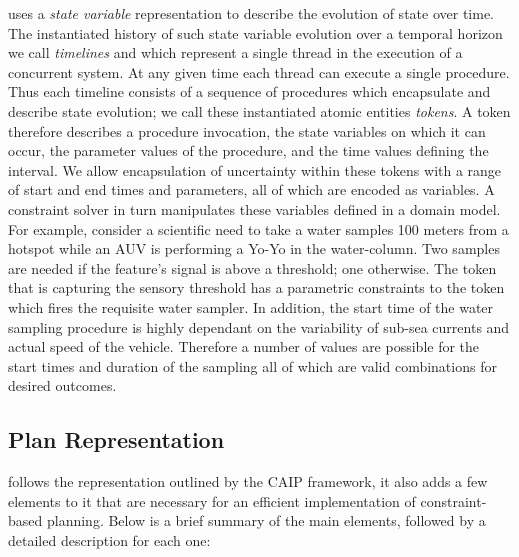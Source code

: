 \eu uses a \emph{state variable} representation to describe the
evolution of state over time. The instantiated history of such state
variable evolution over a temporal horizon we call \emph{timelines}
and which represent a single thread in the execution of a concurrent
system. At any given time each thread can execute a single procedure.
Thus each timeline consists of a sequence of procedures which
encapsulate and describe state evolution; we call these instantiated
atomic entities \emph{tokens}.  A token therefore describes a
procedure invocation, the state variables on which it can occur, the
parameter values of the procedure, and the time values defining the
interval. We allow encapsulation of uncertainty within these tokens
with a range of start and end times and parameters, all of which are
encoded as variables. A constraint solver in turn manipulates these
variables defined in a \eu domain model. For example, consider
a scientific need to take a water samples 100 meters from a hotspot
while an AUV is performing a Yo-Yo in the water-column. Two samples
are needed if the feature's signal is above a threshold; one
otherwise. The token that is capturing the sensory threshold has a
parametric constraints to the token which fires the requisite water
sampler. In addition, the start time of the water sampling procedure
is highly dependant on the variability of sub-sea currents and actual
speed of the vehicle. Therefore a number of values are possible for
the start times and duration of the sampling all of which are valid
combinations for desired outcomes.

\subsection{\eu Plan Representation}
\label{sec:europa:pr}

\eu follows the representation outlined by the CAIP framework, it also
adds a few elements to it that are necessary for an efficient
implementation of constraint-based planning. Below is a brief summary
of the main elements, followed by a detailed description for each one:


